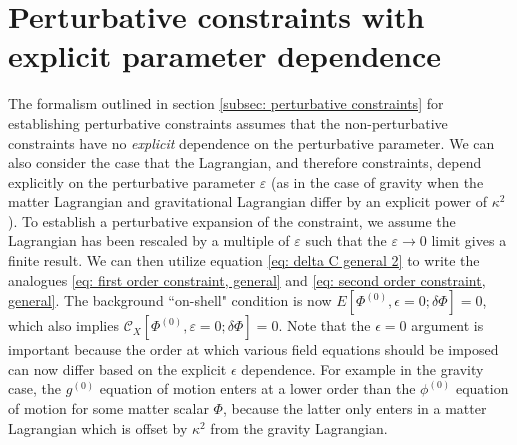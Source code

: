 \documentclass[]{jkpaper}
\theoremstyle{plain}
\theoremstyle{definition}
\begin{document}
\section{Perturbative constraints with explicit parameter dependence}
\label{App: perturbative constraints with explicit dependence}
The formalism outlined in section \ref{subsec: perturbative constraints} for establishing perturbative constraints assumes that the non-perturbative constraints have no \textit{explicit} dependence on the perturbative parameter.
We can also consider the case that the Lagrangian, and therefore constraints, depend explicitly on the perturbative parameter $\varepsilon$ (as in the case of gravity when the matter Lagrangian and gravitational Lagrangian differ by an explicit power of $\kappa^2$). To establish a perturbative expansion of the constraint, we assume the Lagrangian has been rescaled by a multiple of $\varepsilon$ such that the $\varepsilon\rightarrow 0$ limit gives a finite result. 
We can then utilize equation \eqref{eq: delta C general 2} to write the analogues \eqref{eq: first order constraint, general} and \eqref{eq: second order constraint, general}.  
The background ``on-shell" condition is now
$E[\Phi^{(0)},\epsilon=0;\delta\Phi]=0$, which also implies $\mathcal{C}_X[\Phi^{(0)},\varepsilon=0;\delta\Phi]=0$. Note that the $\epsilon=0$ argument is important because the order at which various field equations should be imposed can now differ based on the explicit $\epsilon$ dependence.  For example in the gravity case, the $g^{(0)}$ equation of motion enters at a lower order than the $\phi^{(0)}$ equation of motion for some matter scalar $\Phi$, because the latter only enters in a matter Lagrangian which is offset by $\kappa^2$ from the gravity Lagrangian.
\end{document}
